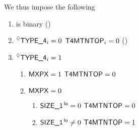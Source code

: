 We thus impose the following
\begin{enumerate}
    \item \mayTriggerNonTrivialOperation{} is binary \quad (\trash)
    \item \If $\prescript{\lozenge}{}{\textsf{TYPE\_4}} _{i} = 0$ \Then $\textsf{T4MTNTOP}_{i} = 0$ \quad (\trash)
    \item \If $\prescript{\lozenge}{}{\textsf{TYPE\_4}} _{i} = 1$ \Then
          \begin{enumerate}
              \item \If $\textsf{MXPX} = 1$ \Then $\textsf{T4MTNTOP} = 0$
              \item \If $\textsf{MXPX} = 0$ \Then
                    \begin{enumerate}
                        \item  \If $\textsf{SIZE}\textsf{\_1}^{\mathsf{\,lo}} =    0$ \Then $\textsf{T4MTNTOP} = 0$
                        \item  \If $\textsf{SIZE}\textsf{\_1}^{\mathsf{\,lo}} \neq 0$ \Then $\textsf{T4MTNTOP} = 1$
                    \end{enumerate}
          \end{enumerate}
\end{enumerate}
